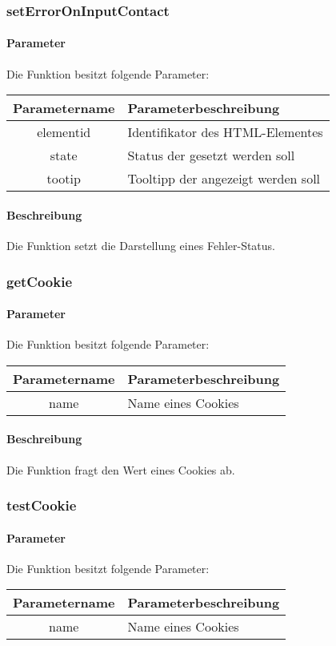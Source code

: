 \subsubsection{setErrorOnInputContact}
\paragraph{Parameter} Die Funktion besitzt folgende Parameter:
\begin{table}[H]
	\begin{tabular}{|c|p{11cm}|}
		\hline
		\textbf{Parametername} & \textbf{Parameterbeschreibung} \\ \hline
		elementid & Identifikator des HTML-Elementes\\ \hline
		state & Status der gesetzt werden soll\\ \hline
		tootip & Tooltipp der angezeigt werden soll\\ \hline
	\end{tabular}
\end{table}
\paragraph{Beschreibung} Die Funktion setzt die Darstellung eines Fehler-Status.
\subsubsection{getCookie}
\paragraph{Parameter} Die Funktion besitzt folgende Parameter:
\begin{table}[H]
	\begin{tabular}{|c|p{11cm}|}
		\hline
		\textbf{Parametername} & \textbf{Parameterbeschreibung} \\ \hline
		name & Name eines Cookies \\ \hline
	\end{tabular}
\end{table}
\paragraph{Beschreibung} Die Funktion fragt den Wert eines Cookies ab.
\subsubsection{testCookie}
\paragraph{Parameter} Die Funktion besitzt folgende Parameter:
\begin{table}[H]
	\begin{tabular}{|c|p{11cm}|}
		\hline
		\textbf{Parametername} & \textbf{Parameterbeschreibung} \\ \hline
		name & Name eines Cookies \\ \hline
	\end{tabular}
\end{table}
